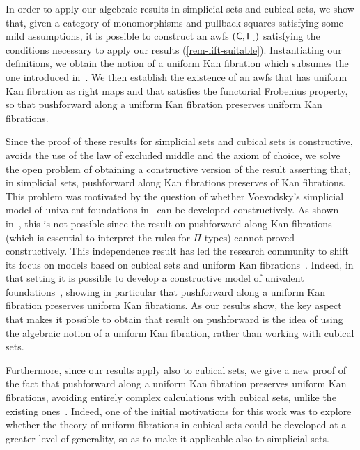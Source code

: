 \documentclass[reqno,10pt,a4paper,oneside,draft]{amsart}
\begin{document}
In order to apply our algebraic results in simplicial sets and cubical sets, we show that, given a category of monomorphisms and pullback squares satisfying some mild assumptions, it is possible to construct an awfs $(\mathsf{C}, \mathsf{F_t})$ satisfying the conditions necessary to apply our results (\cref{rem-lift-suitable}).
Instantiating our definitions, we obtain the notion of a uniform Kan fibration which subsumes the one introduced in~\cite{cohen-et-al:cubicaltt}.
We then establish the existence of an awfs that has uniform Kan fibration as right maps and that satisfies the functorial Frobenius property, so that pushforward along a uniform Kan fibration preserves uniform Kan fibrations.

Since the proof of these results for simplicial sets and cubical sets is constructive, \ie avoids the use of the law of excluded middle and the axiom of choice, we solve the open problem of obtaining a constructive version of the result asserting that, in simplicial sets, pushforward along Kan fibrations preserves of Kan fibrations.
This problem was motivated by the question of whether Voevodsky's simplicial model of univalent foundations in~\cite{voevodsky-simplicial-model} can be developed constructively.
As shown in~\cite{coquand-non-constructivity-kan}, this is not possible since the result on pushforward along Kan fibrations (which is essential to interpret the rules for $\Pi$-types) cannot proved constructively.
This independence result has led the research community to shift its focus on models based on cubical sets and uniform Kan fibrations~\cite{awodey-cubical,coquand-cubical-sets,cohen-et-al:cubicaltt,pitts-cubical-nominal,swan-awfs}.
Indeed, in that setting it is possible to develop a constructive model of univalent foundations~\cite{cohen-et-al:cubicaltt}, showing in particular that pushforward along a uniform Kan fibration preserves uniform Kan fibrations.
As our results show, the key aspect that makes it possible to obtain that result on pushforward is the idea of using the algebraic notion of a uniform Kan fibration, rather than working with cubical sets.

Furthermore, since our results apply also to cubical sets, we give a new proof of the fact that pushforward along a uniform Kan fibration preserves uniform Kan fibrations, avoiding entirely complex calculations with cubical sets, unlike the existing ones~\cite{cohen-et-al:cubicaltt,huber-thesis}.
Indeed, one of the initial motivations for this work was to explore whether the theory of uniform fibrations in cubical sets could be developed at a greater level of generality, so as to make it applicable also to simplicial sets.
\end{document}
